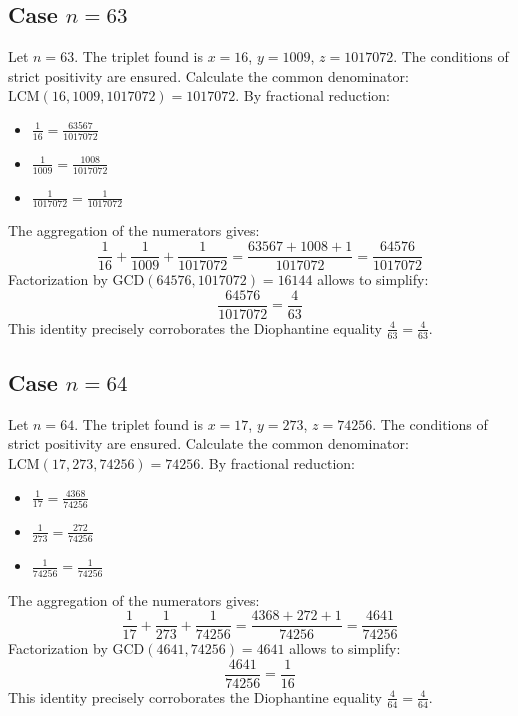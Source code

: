 \documentclass[11pt,a4paper]{article}
\begin{document}
\subsection{Case $n = 63$}
Let $n = 63$. The triplet found is $x = 16$, $y = 1009$, $z = 1017072$.
The conditions of strict positivity are ensured.
Calculate the common denominator: $\text{LCM}(16, 1009, 1017072) = 1017072$.
By fractional reduction:
\begin{itemize}
    \item $\frac{1}{16} = \frac{63567}{1017072}$
    \item $\frac{1}{1009} = \frac{1008}{1017072}$
    \item $\frac{1}{1017072} = \frac{1}{1017072}$
\end{itemize}
The aggregation of the numerators gives:
$$ \frac{1}{16} + \frac{1}{1009} + \frac{1}{1017072} = \frac{63567 + 1008 + 1}{1017072} = \frac{64576}{1017072} $$
Factorization by $\text{GCD}(64576, 1017072) = 16144$ allows to simplify:
$$ \frac{64576}{1017072} = \frac{4}{63} $$
This identity precisely corroborates the Diophantine equality $\frac{4}{63} = \frac{4}{63}$.

\subsection{Case $n = 64$}
Let $n = 64$. The triplet found is $x = 17$, $y = 273$, $z = 74256$.
The conditions of strict positivity are ensured.
Calculate the common denominator: $\text{LCM}(17, 273, 74256) = 74256$.
By fractional reduction:
\begin{itemize}
    \item $\frac{1}{17} = \frac{4368}{74256}$
    \item $\frac{1}{273} = \frac{272}{74256}$
    \item $\frac{1}{74256} = \frac{1}{74256}$
\end{itemize}
The aggregation of the numerators gives:
$$ \frac{1}{17} + \frac{1}{273} + \frac{1}{74256} = \frac{4368 + 272 + 1}{74256} = \frac{4641}{74256} $$
Factorization by $\text{GCD}(4641, 74256) = 4641$ allows to simplify:
$$ \frac{4641}{74256} = \frac{1}{16} $$
This identity precisely corroborates the Diophantine equality $\frac{4}{64} = \frac{4}{64}$.
\end{document}
